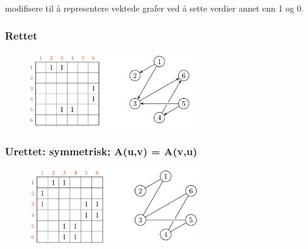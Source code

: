 \documentclass[12pt]{report}
\begin{document}
modifisere til å representere vektede grafer ved å sette verdier annet enn 1 og 0.\par


\vspace{\baselineskip}
\setlength{\parskip}{6.0pt}
\begin{multicols}{2}
\subsubsection*{Rettet}



\begin{figure}[H]
	\begin{Center}
		\includegraphics[width=2.79in,height=1.29in]{./media/image65.png}
	\end{Center}
\end{figure}



\par

\subsubsection*{Urettet: symmetrisk; A(u,v) = A(v,u)}



\begin{figure}[H]
	\begin{Center}
		\includegraphics[width=2.9in,height=1.3in]{./media/image66.png}
	\end{Center}
\end{figure}



\par


\vspace{\baselineskip}

\end{multicols}
\end{document}
